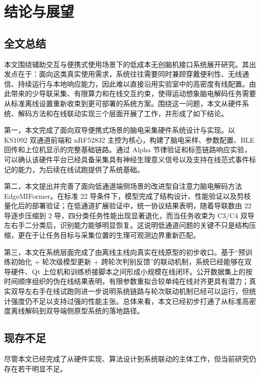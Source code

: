 \chapter{结论与展望}
\label{cha:conclusion}

\section{全文总结}

本文围绕辅助交互与便携式使用场景下的低成本无创脑机接口系统展开研究。其出发点在于：面向这类真实使用需求，系统往往需要同时兼顾穿戴便利性、无线通信、持续运行与本地响应能力，因此难以直接沿用实验室中的高密度有线配置。由此带来的少导联采集、有限算力和在线交互约束，使得运动想象脑电解码任务需要从标准离线设置重新收束到更可部署的系统方案。围绕这一问题，本文从硬件系统、解码方法和在线联动实现三个层面开展了工作，并形成了如下结论。

第一，本文完成了面向双导便携式场景的脑电采集硬件系统设计与实现。以 KS1092 双通道前端和 nRF52832 主控为核心，构建了脑电采样、参数配置、BLE 回传和上位机显示的完整基础链路。通过 Alpha 节律验证和标签链路响应实验，可以确认该硬件平台已经具备采集具有神经生理意义信号以及支持在线范式事件标记的能力，为后续在线试跑提供了系统基础。

第二，本文提出并完善了面向低通道端侧场景的改进型自注意力脑电解码方法 EdgeMIFormer。在标准 22 导条件下，模型完成了结构设计、性能验证以及剪枝量化后的部署验证；在低通道扩展验证中，统一协议结果表明，随着导联数由 22 导逐步压缩到 2 导，四分类任务性能出现显著退化，而当任务收束为 C3/C4 双导左右手二分类后，识别能力能够明显恢复。这说明低通道问题的关键不只是结构压缩，更在于让任务目标与采集位置的生理可观测边界重新匹配。

第三，本文在系统层面完成了由离线主线向真实在线原型的初步收口。基于“预训练初始化 + 轮次级模型更新 + 跨轮次判别反馈”的联动机制，系统已经能够在双导硬件、Qt 上位机和训练桥接脚本之间形成小规模在线闭环。公开数据集上的按时间顺序组织的伪在线结果表明，有限参数重拟合较单纯在线对齐更具有潜力；真实双导左右手在线试跑则进一步说明系统链路与轮次联动机制已经可以运行，但统计强度仍不足以支持过强的性能主张。总体来看，本文已经初步打通了从标准高密度离线解码到双导端侧原型系统的落地路径。

\section{现存不足}

尽管本文已经完成了从硬件实现、算法设计到系统联动的主体工作，但当前研究仍存在若干明显不足。

